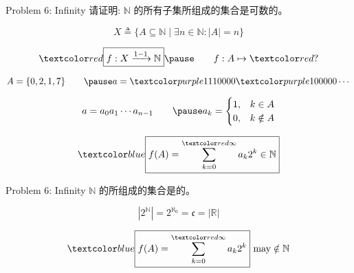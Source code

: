 
\begin{frame}{}
  \begin{exampleblock}{Problem 6: Infinity}
    请证明: $\mathbb{N}$ 的所有子集所组成的集合是可数的。
  \end{exampleblock}

  \pause
  \[
    X \triangleq \Big\{A \subseteq \mathbb{N} \mid \exists n \in \mathbb{N}: |A| = n\Big\}
  \]

  \pause
  \[
    \red{\boxed{f: X \xrightarrow{1-1} \mathbb{N}}}
    \pause \qquad f: A \mapsto \red{?}
  \]

  \pause
  \vspace{-0.30cm}
  \[
    A = \set{0, 2, 1, 7} \qquad \pause a = \purple{111}0000\purple{1}00000\cdots
  \]

  \pause
  \vspace{-0.30cm}
  \[
    a = a_0 a_1 \cdots a_{n-1} \qquad \pause
    a_{k} = \begin{cases}
      1, & k \in A \\
      0, & k \notin A
    \end{cases}
  \]

  \pause
  \vspace{-0.30cm}
  \[
    \blue{\boxed{f(A) = \sum_{k=0}^{\red{\infty}} a_{k} 2^{k} \in \mathbb{N}}}
  \]
\end{frame}

\begin{frame}{}
  \begin{exampleblock}{Problem 6: Infinity}
    $\mathbb{N}$ 的所组成的集合是的。
  \end{exampleblock}

  \pause
  \[
    |2^{\mathbb{N}}| = 2^{\aleph_{0}} = \mathfrak{c} = |\mathbb{R}|
  \]
  
  \pause

  \pause
  \vspace{-0.30cm}
  \[
    \blue{\boxed{f(A) = \sum_{k=0}^{\red{\infty}} a_{k} 2^{k}}} \text{ may} \notin \mathbb{N}
  \]
\end{frame}
